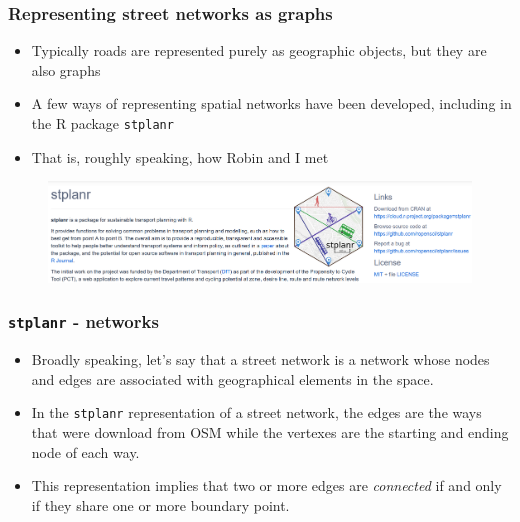 \documentclass[c,10pt,pdftex]{beamer}
\begin{document}
\begin{frame}
  \frametitle{Representing street networks as graphs}
  \vspace{-0.75cm}
  \begin{itemize}
    \setlength\itemsep{1em}
    \item Typically roads are represented purely as geographic objects, but they are also graphs
    \item A few ways of representing spatial networks have been developed, including in the R package \texttt{stplanr}
    \item That is, roughly speaking, how Robin and I met
  \end{itemize}
  \begin{figure}
  	\centering
  	\includegraphics[width = 1.05\linewidth]{images/stplanr-wide-screenshot}
  \end{figure}	
\end{frame}

% 

\begin{frame}
  \frametitle{\texttt{stplanr} - networks}
  \vspace{-0.75cm}
  \begin{itemize}
    \setlength\itemsep{1em}
    \item Broadly speaking, let's say that a street network is a network whose nodes and edges are associated with geographical elements in the space. 
    \item In the \texttt{stplanr} representation of a street network, the edges are the ways that were download from OSM while the vertexes are the starting and ending node of each way. 
    \item This representation implies that two or more edges are \textit{connected} if and only if they share one or more boundary point. 
  \end{itemize}
\end{frame}
\end{document}
